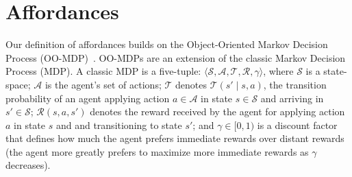 \documentclass[conference]{IEEEtran}
\newcommand{\dnote}[1]{\textcolor{Green}{\textbf{D: #1}}}
\begin{document}




\section{Affordances}
\label{sec:affordances}


Our definition of affordances builds on the Object-Oriented Markov
Decision Process (OO-MDP)~\citep{diuk08}.  OO-MDPs are an extension of
the classic Markov Decision Process (MDP).  A classic MDP is a
five-tuple: $\langle \mathcal{S}, \mathcal{A}, \mathcal{T},
\mathcal{R}, \gamma \rangle$, where $\mathcal{S}$ is a state-space;
$\mathcal{A}$ is the agent's set of actions; $\mathcal{T}$ denotes
$\mathcal{T}(s' \mid s,a)$, the transition probability of an agent
applying action $a \in \mathcal{A}$ in state $s \in \mathcal{S}$ and
arriving in $s' \in \mathcal{S}$; $\mathcal{R}(s,a,s')$ denotes the
reward received by the agent for applying action $a$ in state $s$ and
and transitioning to state $s'$; and $\gamma \in [0, 1)$ is a discount
  factor that defines how much the agent prefers immediate rewards
  over distant rewards (the agent more greatly prefers to maximize
  more immediate rewards as $\gamma$ decreases).
\end{document}

